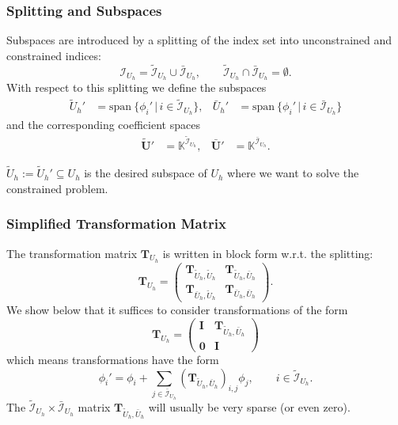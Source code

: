 \begin{frame}
\frametitle<presentation>{Splitting and Subspaces}
Subspaces are introduced by a splitting of
the index set into unconstrained and constrained indices:
\begin{equation*}
\mathcal{I}_{U_h} = \tilde{\mathcal{I}}_{U_h} \cup
\bar{\mathcal{I}}_{U_h}, \qquad  \tilde{\mathcal{I}}_{U_h} \cap
\bar{\mathcal{I}}_{U_h} = \emptyset.
\end{equation*}
With respect to this splitting we define the subspaces
\begin{align*}
\tilde{U}_h' &= \text{span}\ \{\phi_i'\,|\,
i\in\tilde{\mathcal{I}}_{U_h}\}, &
\bar{U}_h' &= \text{span}\ \{\phi_i'\,|\,
i\in\bar{\mathcal{I}}_{U_h}\}
\end{align*}
and the corresponding coefficient spaces
\begin{align*}
\tilde{\mathbf{U}}' &=
\mathbb{K}^{\tilde{\mathcal{I}}_{U_h}}, &
\bar{\mathbf{U}}' &=
\mathbb{K}^{\bar{\mathcal{I}}_{U_h}}.
\end{align*}

$\tilde{U}_h := \tilde{U}_h'\subseteq U_h$ is the desired subspace of
$U_h$ where we want to solve the constrained problem.
\end{frame}


\begin{frame}
\frametitle<presentation>{Simplified Transformation Matrix}
The transformation matrix $\mathbf{T}_{U_h}$ is written in block
form w.r.t. the splitting:
\begin{equation*}
\mathbf{T}_{U_h} = \left(\begin{array}{cc}
\mathbf{T}_{\tilde{U}_h,\tilde{U}_h} & \mathbf{T}_{\tilde{U}_h,\bar{U}_h}\\
\mathbf{T}_{\bar{U}_h,\tilde{U}_h} & \mathbf{T}_{\bar{U}_h,\bar{U}_h}
\end{array}\right) .
\end{equation*}
We show below that it suffices to consider transformations of the form
\begin{equation}\label{Eq:StructureTransformation}
\mathbf{T}_{U_h} = \left(\begin{array}{cc}
\mathbf{I} & \mathbf{T}_{\tilde{U}_h,\bar{U}_h}\\
\mathbf{0} & \mathbf{I}
\end{array}\right)
\end{equation}
which means transformations have the form
\begin{equation*}
\phi_i' = \phi_i + \sum_{j\in\bar{\mathcal{I}}_{U_h}}
\left(\mathbf{T}_{\tilde{U}_h,\bar{U}_h}\right)_{i,j} \phi_j, \qquad i\in \tilde{\mathcal{I}}_{U_h}.
\end{equation*}
The $\tilde{\mathcal{I}}_{U_h} \times \bar{\mathcal{I}}_{U_h}$  matrix
$\mathbf{T}_{\tilde{U}_h,\bar{U}_h}$ will usually be very sparse (or
even zero).
\end{frame}

